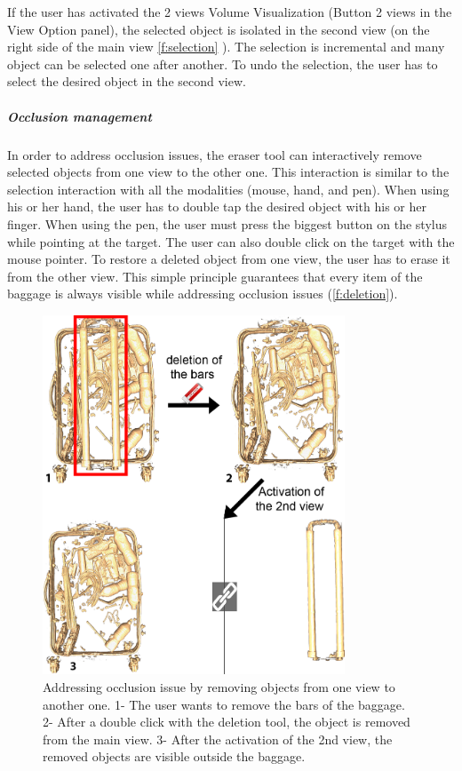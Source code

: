 If the user has activated the 2 views Volume Visualization (Button 2 views in the View Option panel), the selected object is isolated in the second view (on the right side of the main view \autoref{f:selection} ). The selection is incremental and many object can be selected one after another. To undo the selection, the user has to select the desired object in the second view.

\subparagraph{Occlusion management}

In order to address occlusion issues, the eraser tool can interactively remove selected objects from one view to the other one. This interaction is similar to the selection interaction with all the modalities (mouse, hand, and pen). When using his or her hand, the user has to double tap the desired object with his or her finger. When using the pen, the user must press the biggest button on the stylus while pointing at the target. The user can also double click on the target with the mouse pointer. To restore a deleted object from one view, the user has to erase it from the other view. This simple principle guarantees that every item of the baggage is always visible while addressing occlusion issues (\autoref{f:deletion}).

\begin{figure}
\centering   	\includegraphics[width=9cm]{Figures/deletion.png}
	\caption{ Addressing occlusion issue by removing objects from one view to another one. 1- The user wants to remove the bars of the baggage. 2- After a double click with the deletion tool, the object is removed from the main view. 3- After the activation of the 2nd view, the removed objects are visible outside the baggage.}
	\label{f:deletion}
\end{figure}

